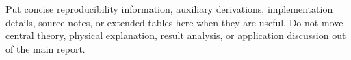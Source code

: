 \documentclass[11pt,a4paper]{article}
\newif\ifResearchHasCitations
\begin{document}
Put concise reproducibility information, auxiliary derivations, implementation
details, source notes, or extended tables here when they are useful. Do not move
central theory, physical explanation, result analysis, or application discussion
out of the main report.


\ifResearchHasCitations
  \IfFileExists{refs.bib}{%
    
    }{}
\fi
\end{document}
